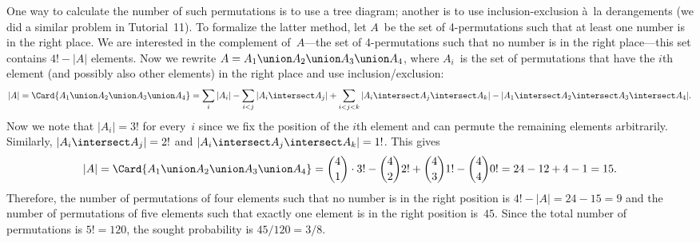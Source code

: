 \begin{problem}
\begin{solution}
  One way to calculate the number of such
  permutations is to use a tree diagram; another is to use
  inclusion-exclusion \`a~la derangements (we did a similar
  problem in Tutorial~11).  To formalize the latter method, let $A$~be
  the set of 4-permutations such that at least one number is in the
  right place. We are interested in the complement of~$A$---the set of
  4-permutations such that no number is in the right place---this set
  contains $4! - |A|$ elements. Now we rewrite $A = A_1 \union A_2 \union
  A_3 \union A_4$, where $A_i$~is the set of permutations that have the
  $i$th element (and possibly also other elements) in the right place
  and use inclusion\slash exclusion:
  \begin{displaymath}
    |A| = \Card{A_1 \union A_2 \union A_3 \union A_4} =
    \sum_i |A_i| - \sum_{i<j} |A_i \intersect A_j|
    + \sum_{i<j<k} |A_i \intersect A_j \intersect A_k| - |A_1 \intersect A_2 \intersect A_3 \intersect A_4|.
  \end{displaymath}
  Now we note that $|A_i| = 3!$ for every~$i$ since we fix the
  position of the $i$th element and can permute the remaining elements
  arbitrarily. Similarly, $|A_i \intersect A_j| = 2!$ and $|A_i \intersect A_j
  \intersect A_k| = 1!$. This gives
\[
|A| = \Card{A_1 \union A_2 \union A_3 \union A_4} =
  \binom{4}{1} \cdot 3! - \binom{4}{2} 2! + \binom{4}{3} 1!
  - \binom{4}{4} 0! = 24 - 12 + 4 - 1 = 15.
\]
  Therefore, the number of permutations of four elements such that no
  number is in the right position is $4! - |A| = 24 - 15 = 9$ and the
  number of permutations of five elements such that exactly one
  element is in the right position is~$45$.  Since the total number of
  permutations is $5! = 120$, the sought probability is $45 / 120 = 3 /
  8$.
\end{solution}

\eparts
\end{problem}


